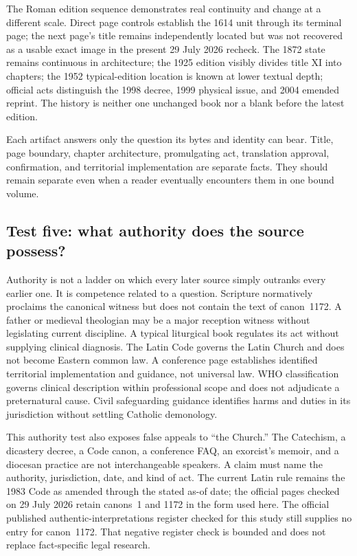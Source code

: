 The Roman edition sequence demonstrates real continuity and change at a
different scale. Direct page controls establish the 1614 unit through its
terminal page; the next page's title remains independently located but was not
recovered as a usable exact image in the present 29 July 2026 recheck. The
1872 state remains continuous in architecture; the 1925 edition visibly
divides title XI into chapters; the 1952 typical-edition location is known at
lower textual depth; official acts distinguish the 1998 decree, 1999 physical
issue, and 2004 emended reprint. The history is neither one unchanged book nor
a blank before the latest edition.

Each artifact answers only the question its bytes and identity can bear.
Title, page boundary, chapter architecture, promulgating act, translation
approval, confirmation, and territorial implementation are separate facts.
They should remain separate even when a reader eventually encounters them in
one bound volume.

\subsection{Test five: what authority does the source possess?}

Authority is not a ladder on which every later source simply outranks every
earlier one. It is competence related to a question. Scripture normatively
proclaims the canonical witness but does not contain the text of canon~1172.
A father or medieval theologian may be a major reception witness without
legislating current discipline. A typical liturgical book regulates its act
without supplying clinical diagnosis. The Latin Code governs the Latin Church
and does not become Eastern common law. A conference page establishes
identified territorial implementation and guidance, not universal law. WHO
classification governs clinical description within professional scope and
does not adjudicate a preternatural cause. Civil safeguarding guidance
identifies harms and duties in its jurisdiction without settling Catholic
demonology.

This authority test also exposes false appeals to ``the Church.'' The
Catechism, a dicastery decree, a Code canon, a conference FAQ, an exorcist's
memoir, and a diocesan practice are not interchangeable speakers. A claim
must name the authority, jurisdiction, date, and kind of act. The current Latin
rule remains the 1983 Code as amended through the stated as-of date; the
official pages checked on 29 July 2026 retain canons~1 and 1172 in the form
used here. The official published authentic-interpretations register checked
for this study still supplies no entry for canon~1172. That negative register
check is bounded and does not replace fact-specific legal research.

